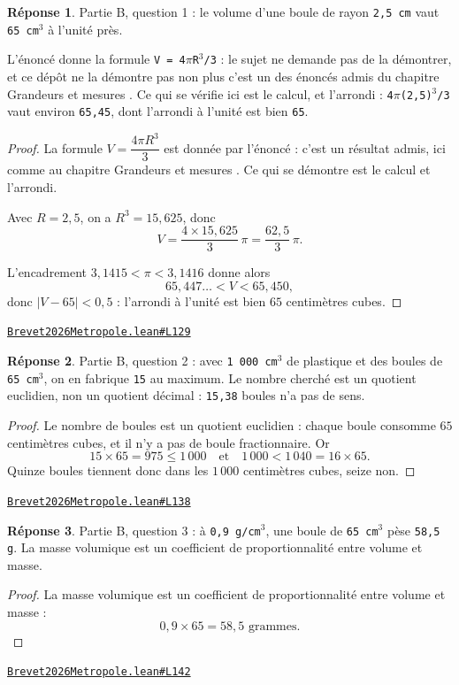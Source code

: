 \documentclass[11pt,a4paper]{article}
\theoremstyle{definition}
\theoremstyle{plain}
\theoremstyle{definition}
\newtheorem*{reponse}{Réponse}
\newcommand{\source}[2]{\par\smallskip\noindent\hfill{\footnotesize\href{#1}{\texttt{#2}}}\par\smallskip}
\begin{document}
\begin{reponse}
Partie B, question 1 : le volume d'une boule de rayon \texttt{2,5 cm} vaut \texttt{65 cm\(^{3}\)}
à l'unité près.

L'énoncé donne la formule \texttt{V = 4\(\pi\)R\(^{3}\)/3} : le sujet ne demande pas de la démontrer,
et ce dépôt ne la démontre pas non plus \textemdash{} c'est un des énoncés admis du chapitre
\og{} Grandeurs et mesures \fg{}. Ce qui se vérifie ici est le calcul, et l'arrondi :
\texttt{4\(\pi\)(2,5)\(^{3}\)/3} vaut environ \texttt{65,45}, dont l'arrondi à l'unité est bien \texttt{65}.
\end{reponse}
\begin{proof}
La formule $V = \dfrac{4\pi R^3}{3}$ est donnée par l'énoncé : c'est un résultat admis, ici
comme au chapitre \og{} Grandeurs et mesures \fg{}. Ce qui se démontre est le calcul et
l'arrondi.

Avec $R = 2{,}5$, on a $R^3 = 15{,}625$, donc
\[ V = \frac{4 \times 15{,}625}{3}\,\pi = \frac{62{,}5}{3}\,\pi . \]

L'encadrement $3{,}1415 < \pi < 3{,}1416$ donne alors
\[ 65{,}447\ldots < V < 65{,}450 , \]
donc $|V - 65| < 0{,}5$ : l'arrondi à l'unité est bien $65$ centimètres cubes.
\end{proof}
\source{https://github.com/Commutator-IO/learn-lean/blob/main/exams/2026/Brevet2026Metropole.lean\#L129}{Brevet2026Metropole.lean\#L129}

\begin{reponse}
Partie B, question 2 : avec \texttt{1 000 cm\(^{3}\)} de plastique et des boules de \texttt{65 cm\(^{3}\)},
on en fabrique \texttt{15} au maximum. Le nombre cherché est un quotient euclidien, non
un quotient décimal : \texttt{15,38} boules n'a pas de sens.
\end{reponse}
\begin{proof}
Le nombre de boules est un quotient euclidien : chaque boule consomme $65$ centimètres
cubes, et il n'y a pas de boule fractionnaire. Or
\[ 15 \times 65 = 975 \le 1\,000 \quad\text{et}\quad 1\,000 < 1\,040 = 16 \times 65 . \]
Quinze boules tiennent donc dans les $1\,000$ centimètres cubes, seize non.
\end{proof}
\source{https://github.com/Commutator-IO/learn-lean/blob/main/exams/2026/Brevet2026Metropole.lean\#L138}{Brevet2026Metropole.lean\#L138}

\begin{reponse}
Partie B, question 3 : à \texttt{0,9 g/cm\(^{3}\)}, une boule de \texttt{65 cm\(^{3}\)} pèse \texttt{58,5 g}.
La masse volumique est un coefficient de proportionnalité entre volume et masse.
\end{reponse}
\begin{proof}
La masse volumique est un coefficient de proportionnalité entre volume et masse :
\[ 0{,}9 \times 65 = 58{,}5 \text{ grammes} . \]
\end{proof}
\source{https://github.com/Commutator-IO/learn-lean/blob/main/exams/2026/Brevet2026Metropole.lean\#L142}{Brevet2026Metropole.lean\#L142}
\end{document}
